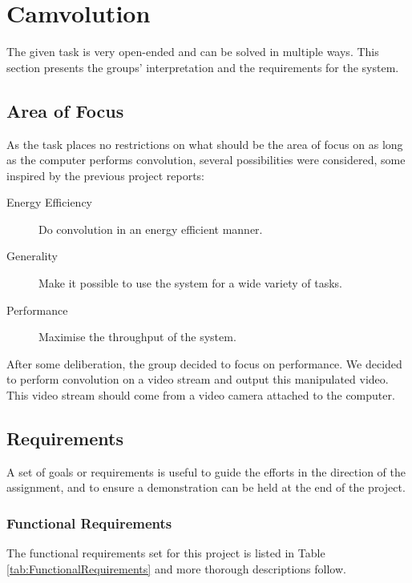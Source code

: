 \section{Camvolution}
The given task \cite{assignment-text} is very open-ended and can be solved in multiple ways.
This section presents the groups' interpretation and the requirements for the system.

\subsection{Area of Focus}
As the task places no restrictions on what should be the area of focus on as long as the computer performs convolution, several possibilities were considered, some inspired by the previous project reports:

\begin{description}
    \item[Energy Efficiency] Do convolution in an energy efficient manner.
    \item[Generality] Make it possible to use the system for a wide variety of tasks.
    \item[Performance] Maximise the throughput of the system.
\end{description}

After some deliberation,
the group decided to focus on performance.
We decided to perform convolution on a video stream and output this manipulated video.
This video stream should come from a video camera attached to the computer.

\subsection{Requirements}
A set of goals or requirements is useful to guide the efforts in the direction of the assignment, and to ensure a demonstration can be held at the end of the project.

\subsubsection{Functional Requirements}
The functional requirements set for this project is listed in Table \ref{tab:FunctionalRequirements} and more thorough descriptions follow.

